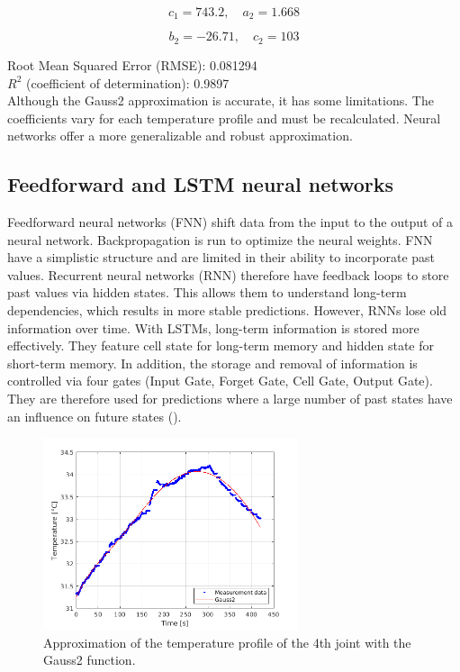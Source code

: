 \documentclass{ifacconf}
\begin{document}
\[
c_1 = 743.2, \quad a_2 = 1.668 
\]

\[
b_2 = -26.71, \quad c_2 = 103
\]


Root Mean Squared Error (RMSE): 0.081294\\
$R^2$ (coefficient of determination): 0.9897\\

Although the Gauss2 approximation is accurate, it has some limitations. 
The coefficients vary for each temperature profile and must be recalculated. 
Neural networks offer a more generalizable and robust approximation.


\subsection{Feedforward and LSTM neural networks}
Feedforward neural networks (FNN) shift data from the input to the output of a neural network. Backpropagation is run to optimize the neural weights. FNN have a simplistic structure and are limited in their ability to incorporate past values. 
Recurrent neural networks (RNN) therefore have feedback loops to store past values via hidden states. This allows them to understand long-term dependencies, which results in more stable predictions.
However, RNNs lose old information over time. With LSTMs, long-term information is stored more effectively. They feature cell state for long-term memory and hidden state for short-term memory. In addition, the storage and removal of information is controlled via four gates (Input Gate, Forget Gate, Cell Gate, Output Gate).  
They are therefore used for predictions where a large number of past states have an influence on future states (\cite{Ljung}).

\begin{figure}[t]
	\begin{center}
		\includegraphics[width=7.5cm]{pictures/Gauss2_legend.png}    %
		\caption{Approximation of the temperature profile of the 4th joint with the Gauss2 function.} 
		\label{fig:Gauss2_legend}
	\end{center}
\end{figure}
\end{document}
